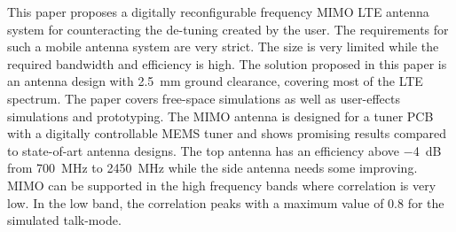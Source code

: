 This paper proposes a digitally reconfigurable frequency MIMO LTE antenna system for counteracting the de-tuning created by the user. The requirements for such a mobile antenna system are very strict. The size is very limited while the required bandwidth and efficiency is high. The solution proposed in this paper is an antenna design with \SI{2.5}{mm} ground clearance, covering most of the LTE spectrum. 
The paper covers free-space simulations as well as user-effects simulations and prototyping. The MIMO antenna is designed for a tuner PCB with a digitally controllable MEMS tuner and shows promising results compared to state-of-art antenna designs. The top antenna has an efficiency above \SI{-4}{dB} from \SI{700}{MHz} to \SI{2450}{MHz} while the side antenna needs some improving. 
MIMO can be supported in the high frequency bands where correlation is very low. In the low band, the correlation peaks with a maximum value of \num{0.8} for the simulated talk-mode.
